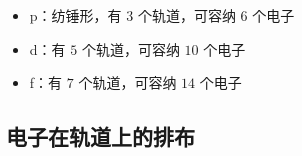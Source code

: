 \documentclass[UTF8,zihao=-4,openany]{ctexbook}
\begin{document}
\begin{itemize}
\item p：纺锤形，有 $3$ 个轨道，可容纳 $6$ 个电子
\end{itemize}

\begin{itemize}
\item d：有 $5$ 个轨道，可容纳 $10$ 个电子
\end{itemize}

\begin{itemize}
\item f：有 $7$ 个轨道，可容纳 $14$ 个电子
\end{itemize}
\subsection{电子在轨道上的排布}
\begingroup
\small
\setlength{\tabcolsep}{3pt}
\renewcommand{\arraystretch}{1.12}
\end{document}
